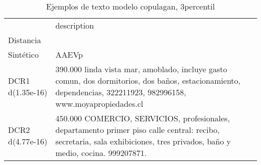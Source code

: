 \begin{table}[H]
\centering
\fontsize{10}{14}\selectfont
\caption{Ejemplos de texto modelo copulagan, 3percentil}
\label{table-example-economicos-b-2-copulagan-3p-text}
\begin{tabular}{|l|m{35em}|}
\hline
\rowcolor[gray]{0.8}
 & description \\
Distancia &  \\
\hline Sintético & AAEVp \\
\hline DCR1 d(1.35e-16) & 390.000 linda vista mar, amoblado, incluye gasto comun, dos dormitorios, dos ba\~nos, estacionamiento, dependencias, 322211923, 982996158, www.moyapropiedades.cl \\
\hline DCR2 d(4.77e-16) & 450.000 COMERCIO, SERVICIOS, profesionales, departamento primer piso calle central: recibo, secretaria, sala exhibiciones, tres privados, ba\~no y medio, cocina. 999207871. \\
\hline
\end{tabular}
\end{table}

